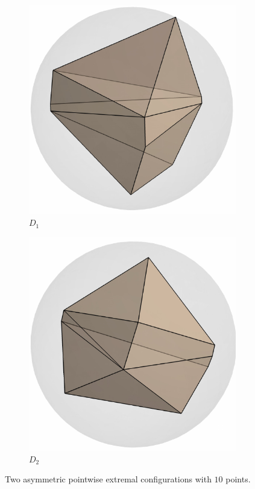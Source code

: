 \documentclass[12pt]{amsart}
\theoremstyle{plain}
\numberwithin{equation}{section}
\begin{document}
\begin{figure}[H]
	\centering
	\begin{subfigure}[b]{0.4\textwidth}
		\centering
		\includegraphics[scale=0.4]{./figures/small_D1.pdf}
		\caption{$D_1$}
	\end{subfigure}
	\hfill
	\begin{subfigure}[b]{0.4\textwidth}
		\centering
		\includegraphics[scale=0.4]{./figures/small_D2.pdf}
		\caption{$D_2$}
	\end{subfigure}
	\caption{Two asymmetric pointwise extremal configurations with $10$ points.}
	\label{tbl:type_D_figures}
\end{figure}
\end{document}
